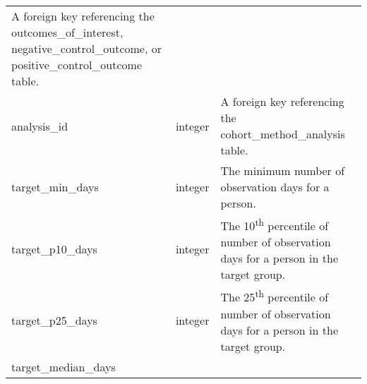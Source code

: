 \documentclass[
]{article}
\begin{document}
\begin{longtable}[]{@{}lll@{}}
\begin{minipage}[t]{0.50\columnwidth}
A foreign key referencing the outcomes\_of\_interest,
negative\_control\_outcome, or positive\_control\_outcome table.\strut
\end{minipage}\tabularnewline
\begin{minipage}[t]{0.23\columnwidth}\raggedright
analysis\_id\strut
\end{minipage} & \begin{minipage}[t]{0.18\columnwidth}\raggedright
integer\strut
\end{minipage} & \begin{minipage}[t]{0.50\columnwidth}\raggedright
A foreign key referencing the cohort\_method\_analysis table.\strut
\end{minipage}\tabularnewline
\begin{minipage}[t]{0.23\columnwidth}\raggedright
target\_min\_days\strut
\end{minipage} & \begin{minipage}[t]{0.18\columnwidth}\raggedright
integer\strut
\end{minipage} & \begin{minipage}[t]{0.50\columnwidth}\raggedright
The minimum number of observation days for a person.\strut
\end{minipage}\tabularnewline
\begin{minipage}[t]{0.23\columnwidth}\raggedright
target\_p10\_days\strut
\end{minipage} & \begin{minipage}[t]{0.18\columnwidth}\raggedright
integer\strut
\end{minipage} & \begin{minipage}[t]{0.50\columnwidth}\raggedright
The 10\textsuperscript{th} percentile of number of observation days for
a person in the target group.\strut
\end{minipage}\tabularnewline
\begin{minipage}[t]{0.23\columnwidth}\raggedright
target\_p25\_days\strut
\end{minipage} & \begin{minipage}[t]{0.18\columnwidth}\raggedright
integer\strut
\end{minipage} & \begin{minipage}[t]{0.50\columnwidth}\raggedright
The 25\textsuperscript{th} percentile of number of observation days for
a person in the target group.\strut
\end{minipage}\tabularnewline
\begin{minipage}[t]{0.23\columnwidth}\raggedright
target\_median\_days\strut

\end{minipage}
\end{longtable}
\end{document}
